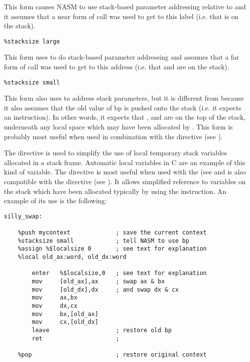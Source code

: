 This form causes NASM to use stack-based parameter addressing
relative to  and it assumes that a near form of call was used
to get to this label (i.e. that  is on the stack).

\begin{lstlisting}
%stacksize large
\end{lstlisting}

This form uses  to do stack-based parameter addressing and
assumes that a far form of call was used to get to this address
(i.e. that  and  are on the stack).

\begin{lstlisting}
%stacksize small
\end{lstlisting}

This form also uses  to address stack parameters, but it is
different from  because it also assumes that the old value
of bp is pushed onto the stack (i.e. it expects an 
instruction). In other words, it expects that ,  and
 are on the top of the stack, underneath any local space which
may have been allocated by . This form is probably most
useful when used in combination with the  directive
(see ).


The  directive is used to simplify the use of local
temporary stack variables allocated in a stack frame. Automatic
local variables in C are an example of this kind of variable. The
 directive is most useful when used with the 
(see  and is also compatible with the  directive
(see ). It allows simplified reference to variables on the
stack which have been allocated typically by using the 
instruction.
An example of its use is the following:

\begin{lstlisting}
silly_swap:

    %push mycontext             ; save the current context
    %stacksize small            ; tell NASM to use bp
    %assign %$localsize 0       ; see text for explanation
    %local old_ax:word, old_dx:word

        enter   %$localsize,0   ; see text for explanation
        mov     [old_ax],ax     ; swap ax & bx
        mov     [old_dx],dx     ; and swap dx & cx
        mov     ax,bx
        mov     dx,cx
        mov     bx,[old_ax]
        mov     cx,[old_dx]
        leave                   ; restore old bp
        ret                     ;

    %pop                        ; restore original context
\end{lstlisting}

